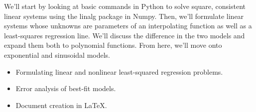 \documentclass[article, 11pt]{article}
\begin{document}
\noindent {}

\vspace{-.35cm}
\noindent \hrulefill

We'll start by looking at basic commands in Python to solve square, consistent linear systems using the linalg package in Numpy.  Then, we'll formulate linear systems whose unknowns are parameters of an interpolating function as well as a least-squares regression line.  We'll discuss the difference in the two models and expand them both to polynomial functions.  From here, we'll move onto exponential and sinusoidal models.    \\

\noindent {}

\vspace{-.35cm}
\noindent \hrulefill

\begin{itemize}
	\item Formulating linear and nonlinear least-squared regression problems.  
	\item Error analysis of best-fit models.
	\item Document creation in \LaTeX. 
\end{itemize}

\noindent \hrulefill
\end{document}
